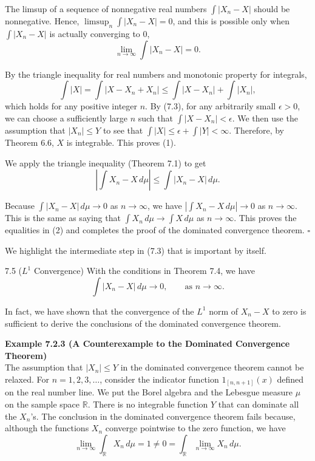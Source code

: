 The limsup of a sequence of nonnegative real numbers $\int |X_n-X|$ should be nonnegative. Hence, $\limsup_n \int |X_n-X|=0$, and this is possible only when $\int |X_n-X|$ is actually converging to $0$,
\begin{equation}
\lim_{n\to\infty} \int |X_n-X| = 0.
\tag{7.3}
\end{equation}

By the triangle inequality for real numbers and monotonic property for integrals,
\[
\int |X| = \int |X-X_n+X_n| \le \int |X-X_n| + \int |X_n|,
\]
which holds for any positive integer $n$. By (7.3), for any arbitrarily small $\epsilon>0$, we can choose a sufficiently large $n$ such that $\int |X-X_n|<\epsilon$. We then use the assumption that $|X_n|\le Y$ to see that $\int |X| \le \epsilon + \int |Y| < \infty$. Therefore, by Theorem 6.6, $X$ is integrable. This proves (1).

We apply the triangle inequality (Theorem 7.1) to get
\[
\left|\int X_n - X\, d\mu\right| \le \int |X_n-X|\, d\mu.
\]

Because $\int |X_n-X|\, d\mu \to 0$ as $n\to\infty$, we have $|\int X_n - X\, d\mu|\to 0$ as $n\to\infty$. This is the same as saying that $\int X_n\, d\mu \to \int X\, d\mu$ as $n\to\infty$. This proves the equalities in (2) and completes the proof of the dominated convergence theorem. \hfill $\square$

We highlight the intermediate step in (7.3) that is important by itself.

\begin{thmbox}{7.5 ($L^1$ Convergence)}
With the conditions in Theorem 7.4, we have
\[
\int |X_n-X|\, d\mu \to 0, \qquad \text{as } n\to\infty.
\]
\end{thmbox}

In fact, we have shown that the convergence of the $L^1$ norm of $X_n-X$ to zero is sufficient to derive the conclusions of the dominated convergence theorem.

\textbf{Example 7.2.3 (A Counterexample to the Dominated Convergence Theorem)} \\
The assumption that $|X_n|\le Y$ in the dominated convergence theorem cannot be relaxed. For $n=1,2,3,\dots$, consider the indicator function $1_{[n,n+1]}(x)$ defined on the real number line. We put the Borel algebra and the Lebesgue measure $\mu$ on the sample space $\mathbb{R}$. There is no integrable function $Y$ that can dominate all the $X_n$'s. The conclusion in the dominated convergence theorem fails because, although the functions $X_n$ converge pointwise to the zero function, we have
\[
\lim_{n\to\infty} \int_{\mathbb{R}} X_n\, d\mu = 1 \neq 0 = \int_{\mathbb{R}} \lim_{n\to\infty} X_n\, d\mu.
\]

